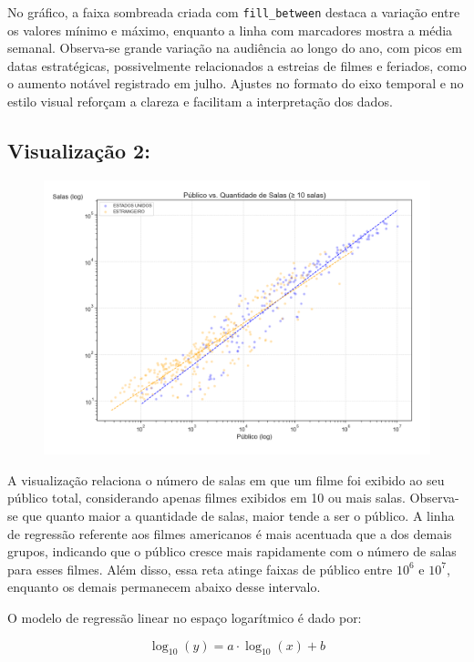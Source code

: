 \documentclass{article}
\begin{document}
No gráfico, a faixa sombreada criada com \texttt{fill\_between} destaca a variação entre os valores mínimo e máximo, enquanto a linha com marcadores mostra a média semanal. Observa-se grande variação na audiência ao longo do ano, com picos em datas estratégicas, possivelmente relacionados a estreias de filmes e feriados, como o aumento notável registrado em julho. Ajustes no formato do eixo temporal e no estilo visual reforçam a clareza e facilitam a interpretação dos dados.


\subsection*{Visualização 2:}
\begin{figure}[H]
    \centerline{\includegraphics[width = \linewidth]{img/Figure_2.png}}
\end{figure}

A visualização relaciona o número de salas em que um filme foi exibido ao seu público total, considerando apenas filmes exibidos em 10 ou mais salas. Observa-se que quanto maior a quantidade de salas, maior tende a ser o público. A linha de regressão referente aos filmes americanos é mais acentuada que a dos demais grupos, indicando que o público cresce mais rapidamente com o número de salas para esses filmes. Além disso, essa reta atinge faixas de público entre \(10^{6}\) e \(10^{7}\), enquanto os demais permanecem abaixo desse intervalo.

O modelo de regressão linear no espaço logarítmico é dado por:

\[
\log_{10}(y) = a \cdot \log_{10}(x) + b
\]
\end{document}
